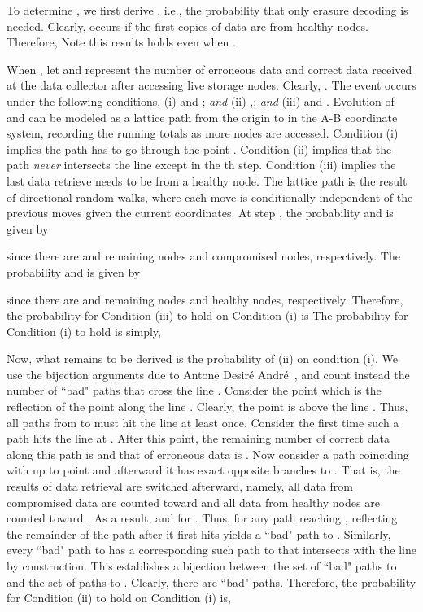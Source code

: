 \documentclass[10pt,journal,letterpaper,compsoc]{IEEEtran}
\newcommand{\0}{{\bf 0}}
\newcounter{step}
\begin{document}
To determine , we first derive , i.e., the
probability that only erasure decoding is needed. Clearly,  occurs if
the first  copies of data are from healthy nodes. Therefore,  Note this results holds even when .
			
When , let
 and  represent the number of erroneous data and correct data
received at the data collector after accessing  live storage nodes. Clearly,
.  The event  occurs under the following conditions, (i)
 and ; {\it and} (ii) ,; {\it and} (iii)  and .
Evolution of  and  can be modeled as a lattice path from the origin
 to  in the A-B coordinate system, recording the running
totals as more nodes are accessed. Condition (i) implies the
path has to go through the point .  Condition (ii) implies that the path {\it
never} intersects the line  except in the th step.  Condition (iii) implies the last data
retrieve needs to be from a healthy node. The lattice path is the result of
directional random walks, where each move is conditionally independent of the
previous moves given the current coordinates. At step , the probability  and  is given by

since there are  and
 remaining nodes and compromised nodes, respectively. The probability
 and  is given by

since there are  and  remaining nodes and healthy nodes,
respectively. Therefore, the probability for Condition (iii) to hold on Condition  (i) is
 The probability for Condition (i) to hold is simply,


Now, what remains to be derived is the probability of (ii) on condition (i).
We use the bijection arguments due to Antone Desir\'{e} Andr\'{e}~\cite{west:01}, and count
instead the number of ``bad" paths that cross the line . Consider the point  which is the reflection of the point  along the line . Clearly, the point  is above the line . Thus, all paths from  to  must hit the line  at least once. Consider the
first time such a path  hits the line  at . After this point, the remaining number of correct data  along this path is  and that of erroneous data is . Now consider a path  coinciding with  up to point  and afterward it has exact opposite branches to . That is,
the results of data retrieval are switched afterward, namely, all data from compromised data
are counted toward  and all data from healthy nodes are counted toward
. As a result,  and  for .  Thus, for any path reaching , reflecting the remainder of the path
after it first hits  yields a ``bad" path to . Similarly, every ``bad" path to   has a corresponding such path to  that intersects with the line  by construction. This
establishes a bijection between the set of ``bad" paths to  and
the set of paths to . Clearly, there are 
``bad" paths. Therefore, the probability for Condition (ii) to hold on Condition (i) is,
\end{document}

